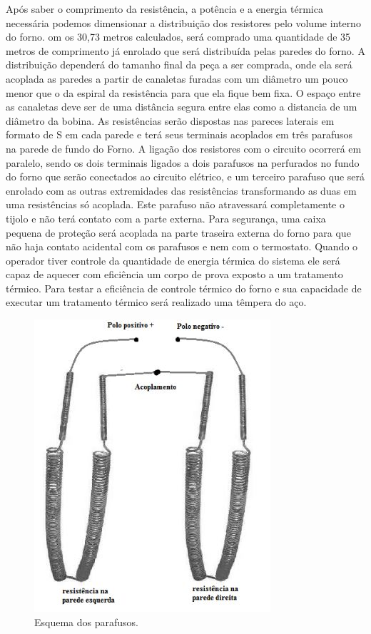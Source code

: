 Após saber o comprimento da resistência, a potência e a energia térmica necessária podemos dimensionar a distribuição dos resistores pelo volume interno do forno. om os 30,73 metros calculados, será comprado uma quantidade de 35 metros de comprimento já enrolado que será distribuída pelas paredes do forno.
A distribuição dependerá do tamanho final da peça a ser comprada, onde ela será acoplada as paredes a partir de canaletas furadas com um diâmetro um pouco menor que o da espiral da resistência para que ela fique bem fixa. O espaço entre as canaletas deve ser de uma distância segura entre elas como a distancia de um diâmetro da bobina. As resistências serão dispostas nas pareces laterais em formato de S em cada parede e terá seus terminais acoplados em três parafusos na parede de fundo do Forno. A ligação dos resistores com o circuito ocorrerá em paralelo, sendo os dois terminais ligados a dois parafusos na perfurados no fundo do forno que serão conectados ao circuito elétrico, e um terceiro parafuso que será enrolado com as outras extremidades das resistências transformando as duas em uma resistências só acoplada. Este parafuso não atravessará completamente o tijolo e não terá contato com a parte externa. Para segurança, uma caixa pequena de proteção será acoplada na parte traseira externa do forno para que não haja contato acidental com os parafusos e nem com o termostato.
Quando o operador tiver controle da quantidade de energia térmica do sistema ele será capaz de aquecer com eficiência um corpo de prova exposto a um tratamento térmico. Para testar a eficiência de controle térmico do forno e sua capacidade de executar um tratamento térmico será realizado uma têmpera do aço.
\begin{figure}[!h]
	\centering
	\label{parafusos}
	\includegraphics[keepaspectratio=true,scale=0.8]{figuras/parafusos.JPG}
	\caption{Esquema dos parafusos.}
\end{figure}


